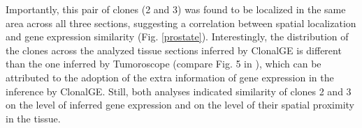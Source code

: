 \documentclass[unnumsec,webpdf,contemporary,large]{oup-authoring-template}%
\theoremstyle{thmstyleone}%
\theoremstyle{thmstyletwo}%
\theoremstyle{thmstylethree}%
\begin{document}
Importantly, this pair of clones (2 and 3) was found to be localized in the same area across all three sections, suggesting a  correlation between spatial localization and gene expression similarity (Fig. \ref{prostate}). Interestingly, the distribution of the clones across the analyzed tissue sections inferred by ClonalGE is different than the one inferred by Tumoroscope (compare Fig. 5 in \cite{shafighi2024integrative}), which can be attributed to the adoption of the extra information of gene expression in the inference by ClonalGE. Still, both analyses indicated similarity of clones 2 and 3 on the level of inferred gene expression and on the level of their spatial proximity in the tissue. 


\end{document}
